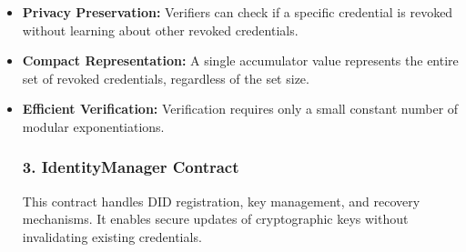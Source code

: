 \documentclass[lettersize,journal]{IEEEtran}
\begin{document}
\begin{itemize}
    \item \textbf{Privacy Preservation:} Verifiers can check if a specific credential is revoked without learning about other revoked credentials.
    
    \item \textbf{Compact Representation:} A single accumulator value represents the entire set of revoked credentials, regardless of the set size.
    
    \item \textbf{Efficient Verification:} Verification requires only a small constant number of modular exponentiations.
\subsubsection{3. IdentityManager Contract}
This contract handles DID registration, key management, and recovery mechanisms. It enables secure updates of cryptographic keys without invalidating existing credentials.


\end{itemize}
\end{document}

